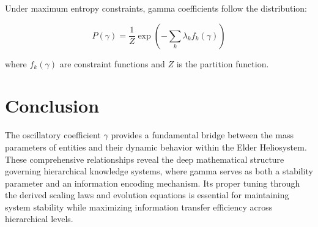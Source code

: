 \begin{theorem}
Under maximum entropy constraints, gamma coefficients follow the distribution:

\begin{equation}
P(\gamma) = \frac{1}{Z} \exp\left(-\sum_k \lambda_k f_k(\gamma)\right)
\end{equation}

where $f_k(\gamma)$ are constraint functions and $Z$ is the partition function.
\end{theorem}

\section{Conclusion}

The oscillatory coefficient $\gamma$ provides a fundamental bridge between the mass parameters of entities and their dynamic behavior within the Elder Heliosystem. These comprehensive relationships reveal the deep mathematical structure governing hierarchical knowledge systems, where gamma serves as both a stability parameter and an information encoding mechanism. Its proper tuning through the derived scaling laws and evolution equations is essential for maintaining system stability while maximizing information transfer efficiency across hierarchical levels.
